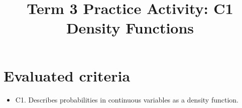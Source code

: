 \makeatletter
{}
\makeatother	


\usepackage{pgfplots}
\pgfplotsset{compat=1.18}

\title{Term 3 Practice Activity: C1 Density Functions}
\author{}
\date{}


	\maketitle

	\setcounter{tocdepth}{1}
	\setcounter{secnumdepth}{2}
	\tableofcontents

	\section*{Evaluated criteria}
	\begin{itemize}
		\item C1. Describes probabilities in continuous variables as a density function.
	\end{itemize}
	

\newcommand{\COneGraph}[7]{
\begin{center}
\begin{tikzpicture}
\pgfmathsetmacro{\supportA}{#1}
\pgfmathsetmacro{\supportB}{#2}
\pgfmathsetmacro{\pad}{0.12*(\supportB-\supportA)}
\begin{axis}[
  width=9cm,
  height=5cm,
  axis lines=left,
  xlabel={$x$},
  ylabel={$f(x)$},
  xmin={\supportA-\pad},
  xmax={\supportB+\pad},
  ymin=0,
  ymax=#7,
  grid=both,
  xtick={#6}
]
\addplot[domain=#1:#2, samples=160, draw=none, fill=blue!20, fill opacity=0.35] {#3} \closedcycle;
\addplot[domain=#4:#5, samples=160, draw=none, fill=blue!60, fill opacity=0.55] {#3} \closedcycle;
\addplot[smooth, domain=#1:#2, samples=160, thick] {#3};
\end{axis}
\end{tikzpicture}
\end{center}
}

\newcommand{\COneCompareGraph}[6]{
\begin{center}
\begin{tikzpicture}
\begin{axis}[
  width=9cm,
  height=5cm,
  axis lines=left,
  xlabel={$x$},
  ylabel={$f(x)$},
  xmin=#1,
  xmax=#2,
  ymin=0,
  ymax=#6,
  grid=both,
  xtick={0,1,2,3,4,5}
]
\addplot[smooth, domain=#3:#4, samples=150, thick, blue] {#5};
\addplot[smooth, domain=#3:#4, samples=150, thick, red, dashed] {#5*1.6};
\end{axis}
\end{tikzpicture}
\end{center}
}

